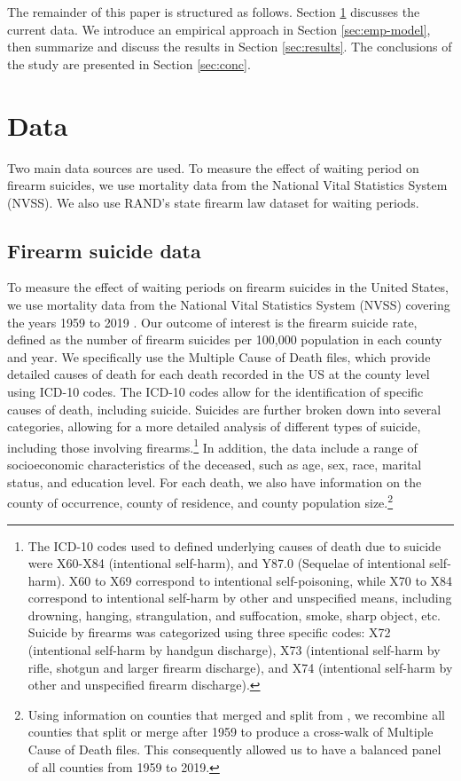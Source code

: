 The remainder of this paper is structured as follows. Section \ref{sec:data} discusses the current data. We introduce an empirical approach in Section \ref{sec:emp-model}, then summarize and discuss the results in Section \ref{sec:results}. The conclusions of the study are presented in Section \ref{sec:conc}. 

\section{Data} \label{sec:data}

Two main data sources are used. To measure the effect of waiting period on firearm suicides, we use mortality data from the National Vital Statistics System (NVSS). We also use RAND's state firearm law dataset for waiting periods.

\subsection*{Firearm suicide data}

To measure the effect of waiting periods on firearm suicides in the United States, we use mortality data from the National Vital Statistics System (NVSS) covering the years 1959 to 2019 \autocite{statisticsNationalVitalStatistics2007}. Our outcome of interest is the firearm suicide rate, defined as the number of firearm suicides per 100,000 population in each county and year. We specifically use the Multiple Cause of Death files, which provide detailed causes of death for each death recorded in the US at the county level using ICD-10 codes. The ICD-10 codes allow for the identification of specific causes of death, including suicide. Suicides are further broken down into several categories, allowing for a more detailed analysis of different types of suicide, including those involving firearms.\footnote{The ICD-10 codes used to defined underlying causes of death due to suicide were X60-X84 (intentional self-harm), and Y87.0 (Sequelae of intentional self-harm). X60 to X69 correspond to intentional self-poisoning, while X70 to X84 correspond to intentional self-harm by other and unspecified means, including drowning, hanging, strangulation, and suffocation, smoke, sharp object, etc. Suicide by firearms was categorized using three specific codes: X72 (intentional self-harm by handgun discharge), X73 (intentional self-harm by rifle, shotgun and larger firearm discharge), and X74 (intentional self-harm by other and unspecified firearm discharge).} In addition, the data include a range of socioeconomic characteristics of the deceased, such as age, sex, race, marital status, and education level. For each death, we also have information on the county of occurrence, county of residence, and county population size.\footnote{Using information on counties that merged and split from \textcite{forstall1994population, bailey2015war}, we recombine all counties that split or merge after 1959 to produce a cross-walk of Multiple Cause of Death files. This consequently allowed us to have a balanced panel of all counties from 1959 to 2019.}

